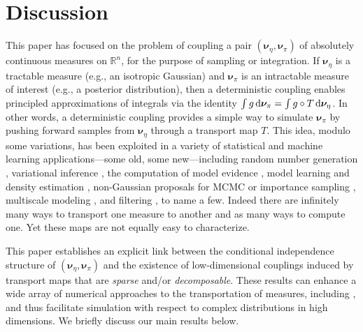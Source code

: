 \documentclass[twoside,11pt]{article}
\newcommand{\genm}{\boldsymbol{\nu} }   %
\newcommand{\re}{\mathbb{R}}
\begin{document}
\section{Discussion} %
\label{sec:discus}
%
%
%
%
This paper has focused on the problem of coupling a pair $(\genm_\eta,\genm_\pi)$ of
absolutely continuous measures on $\re^n$,
for the purpose of sampling or integration.
If $\genm_\eta$ is a tractable measure (e.g., an isotropic Gaussian) and
$\genm_\pi$ is an intractable measure of interest (e.g., a
posterior distribution), then a deterministic coupling
%
enables principled approximations of integrals 
%
%
%
%
%
%
via the identity $\int g\,{\rm d}\genm_\pi = \int g\circ T\,{\rm
d}\genm_\eta$. In other words, a deterministic coupling provides a
simple way to simulate $\genm_\pi$ by pushing forward samples from
$\genm_\eta$ through a transport map $T$.
%
%
%
%
This idea, modulo some variations, %
has been exploited in a variety of statistical and machine
learning applications---some old, some new---including
random number generation \citep{marsaglia2000ziggurat},
variational inference  %
\citep{el2012bayesian,schillings2014scaling,rezende2015variational},
 the 
computation of model evidence 
\citep{meng2002warp},
%
model learning and density estimation
\citep{laparra2011iterative,anderes2012general,stavropoulou2015parametrization},
non-Gaussian proposals for MCMC or importance sampling
\citep{parno2014transport,Bardsley2014,oliver2015metropolized},
%
%
%
multiscale modeling \citep{parno2015multiscale}, and
%
filtering
\citep{daum2008particle,chorin2009implicit,reich2013nonparametric},
%
to name a few. Indeed there are infinitely many ways to transport one
measure to another \citep{villani2008optimal} and as many ways to
compute one.  Yet these maps are not equally easy to
characterize.
%


This paper establishes an explicit link
between the conditional independence structure of 
$(\genm_\eta,\genm_\pi)$ and the
existence of low-dimensional couplings induced by transport
maps that are {\it sparse} and/or 
{\it decomposable}.
These results 
%
%
can enhance
%
%
%
a 
%
%
%
wide array of numerical approaches to
the transportation of measures, including 
%
\citep{tabak2013family,rezende2015variational,liu2016stein,bigoni2016monotone}, 
and thus facilitate simulation with
respect to complex distributions in high dimensions. 
We briefly discuss our main results below.
%
%
%
%

%
%
%


%

%
%
%
%
%
%
%
%
%
%
%
%
%
%
%
%
%
%
\end{document}
